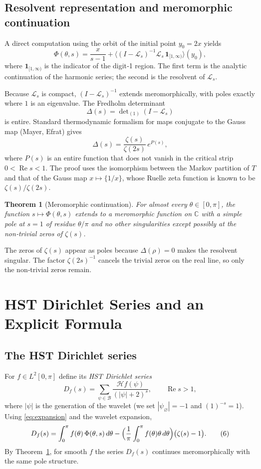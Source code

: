 \documentclass[11pt,a4paper]{article}
\newtheorem{theorem}{Theorem}[section]
\theoremstyle{remark}
\begin{document}
\subsection{Resolvent representation and meromorphic continuation}
A direct computation using the orbit of the initial point \(y_0=2x\) yields
\begin{equation}\label{eq:resolvent}
\Phi(\theta,s)=\frac{x}{s-1}+\bigl\langle (I-\mathcal{L}_s)^{-1}\mathcal{L}_s\,\mathbf{1}_{[1,\infty)}\bigr\rangle(y_0),
\end{equation}
where \(\mathbf{1}_{[1,\infty)}\) is the indicator of the digit‑1 region. The first term is the analytic continuation of the harmonic series; the second is the resolvent of \(\mathcal{L}_s\).

Because \(\mathcal{L}_s\) is compact, \((I-\mathcal{L}_s)^{-1}\) extends meromorphically, with poles exactly where \(1\) is an eigenvalue. The Fredholm determinant
\[
\Delta(s)=\det\nolimits_{(1)}(I-\mathcal{L}_s)
\]
is entire. Standard thermodynamic formalism for maps conjugate to the Gauss map (Mayer, Efrat) gives
\begin{equation}\label{eq:detident}
\Delta(s)=\frac{\zeta(s)}{\zeta(2s)}\,e^{P(s)},
\end{equation}
where \(P(s)\) is an entire function that does not vanish in the critical strip \(0<\operatorname{Re}s<1\). The proof uses the isomorphism between the Markov partition of \(T\) and that of the Gauss map \(x\mapsto\{1/x\}\), whose Ruelle zeta function is known to be \(\zeta(s)/\zeta(2s)\).

\begin{theorem}[Meromorphic continuation]\label{thm:Phi}
For almost every \(\theta\in[0,\pi]\), the function \(s\mapsto\Phi(\theta,s)\) extends to a meromorphic function on \(\mathbb{C}\) with a simple pole at \(s=1\) of residue \(\theta/\pi\) and no other singularities except possibly at the non‑trivial zeros of \(\zeta(s)\).
\end{theorem}
The zeros of \(\zeta(s)\) appear as poles because \(\Delta(\rho)=0\) makes the resolvent singular. The factor \(\zeta(2s)^{-1}\) cancels the trivial zeros on the real line, so only the non‑trivial zeros remain.

\section{HST Dirichlet Series and an Explicit Formula}

\subsection{The HST Dirichlet series}
For \(f\in L^2[0,\pi]\) define its \emph{HST Dirichlet series}
\[
D_f(s)=\sum_{\psi\in\mathcal{B}}\frac{\mathcal{H}f(\psi)}{(|\psi|+2)^s},
\qquad \operatorname{Re}s>1,
\]
where \(|\psi|\) is the generation of the wavelet (we set \(|\psi_\varnothing|=-1\) and \((1)^{-s}=1\)). Using \eqref{eq:expansion} and the wavelet expansion,
\[
D_f(s)=\int_0^\pi f(\theta)\,\Phi(\theta,s)\,d\theta
      -\Bigl(\frac{1}{\pi}\int_0^\pi f(\theta)\theta\,d\theta\Bigr)\bigl(\zeta(s)-1\bigr).
\tag{6}
\]
By Theorem~\ref{thm:Phi}, for smooth \(f\) the series \(D_f(s)\) continues meromorphically with the same pole structure.
\end{document}
